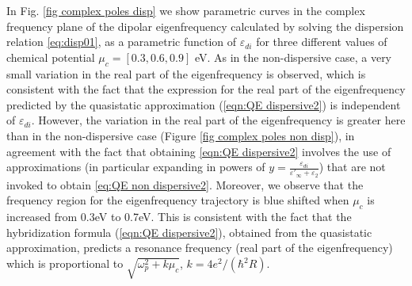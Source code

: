 \documentclass[9pt,twocolumn,twoside]{osajnl}
\begin{document}
In Fig. \ref{fig complex poles disp} we show parametric curves in the 
complex frequency plane of the dipolar eigenfrequency calculated by solving the dispersion relation \eqref{eq:disp01}, as a parametric function of $\varepsilon_{di}$ for three different values of chemical potential $\mu_c = [0.3,0.6,0.9]$ eV. 
%
%
As in the non-dispersive case, a very small variation in the real part of the eigenfrequency is observed, 
which is consistent with the fact that the expression for the real part of the eigenfrequency predicted by the quasistatic approximation (\ref{eqn:QE dispersive2}) is independent of $\varepsilon_{di}$. 
However, the variation in the real part of the eigenfrequency is greater here than in the non-dispersive case (Figure \ref{fig complex poles non disp}), in agreement with the fact that 
obtaining \eqref{eqn:QE dispersive2} involves the use of approximations (in particular expanding in powers of $y=\frac{\varepsilon_{di}}{\varepsilon'_\infty+\varepsilon_2}$) that are not invoked to obtain  \eqref{eq:QE non dispersive2}. 
%
Moreover, we observe that the frequency region for the eigenfrequency trajectory is blue shifted when $\mu_{c}$ is increased from 0.3eV to 0.7eV. This is consistent with the fact that the hybridization formula (\ref{eqn:QE dispersive2}), obtained from the quasistatic  approximation, predicts a resonance frequency (real part of the eigenfrequency) which is proportional to $\sqrt{\omega_p^2+k\mu_c}$, $k=4 e^2/(\hbar^2 R)$.


\end{document}
